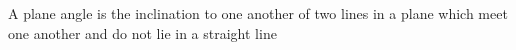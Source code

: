 \documentclass[preview]{standalone}
\begin{document}
\begin{center}
A plane angle is the inclination to one another of two lines in a plane which meet one another and do not lie in a straight line
\end{center}
\end{document}
